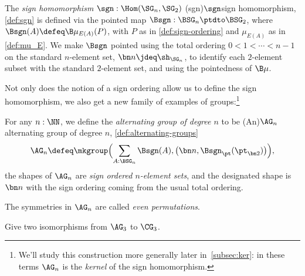 \begin{definition}\label{def:sgn}
  The \emph{sign homomorphism} $\sgn : \Hom(\SG_n,\SG_2)$%
  \glossary(sgn){$\protect\sgn$}{sign homomorphism, \cref{def:sgn}}
  is defined via the pointed map $\Bsgn : \BSG_n \ptdto \BSG_2$,
  where $\Bsgn(A) \defeq \B\mu_{E(A)}(P)$, with $P$ as in
  \cref{def:sign-ordering} and $\mu_{E(A)}$ as in \cref{def:mu_E}.
  We make $\Bsgn$ pointed using the total ordering 
  $0 < 1 < \cdots < n-1$ on the standard $n$-element set, 
  $\bn n \jdeq \sh_{\SG_n}$, to identify each $2$-element 
  subset with the standard $2$-element set,
  and using the pointedness of $\B\mu$.
\end{definition}
Not only does the notion of a sign ordering allow us to define the
sign homomorphism, we also get a new family of examples of groups:\footnote{%
  We'll study this construction more generally later in~\cref{subsec:ker}:
  in these terms $\AG_n$ is the \emph{kernel} of the sign homomorphism.}
\begin{definition}\label{def:alternating-groups}
  For any $n:\NN$, we define the \emph{alternating group of degree $n$}
  to be%
  \glossary(An){$\protect\AG_n$}{alternating group of degree $n$,
      \cref{def:alternating-groups}}
  \[
    \AG_n \defeq \mkgroup\Bigl(\sum_{A:\BSG_n}\Bsgn(A),
      \bigl(\bn n, \Bsgn_\pt(\pt_{\bn 2})\bigr)\Bigr),
  \]
  \ie the shapes of $\AG_n$ are \emph{sign ordered $n$-element sets},
  and the designated shape is $\bn n$ with the sign ordering coming
  from the usual total ordering.

  The symmetries in $\AG_n$ are called \emph{even permutations}.%
\end{definition}

\begin{xca}\label{xca:isos_A3_C3}
  Give two isomorphisms from $\AG_3$ to $\CG_3$.
\end{xca}

